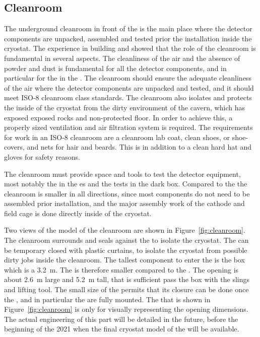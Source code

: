 \subsection{Cleanroom}
The underground cleanroom in front of the  is the main place where the detector components are unpacked, assembled and tested prior the installation inside the cryostat.
The experience in building  and  showed that the role of the cleanroom is fundamental in several aspects.
The cleanliness of the air and the absence of powder and dust is fundamental for all the detector components, and in particular for the  in the .
The cleanroom should ensure the adequate cleanliness of the air where the detector components are unpacked and tested, and it should meet ISO-8 cleanroom class standards.
The cleanroom also isolates and protects the inside of the cryostat from the dirty environment of the cavern, which has exposed exposed rocks and non-protected floor.
In order to achieve this, a properly sized ventilation and air filtration system is required.
The requirements for work in an ISO-8 cleanroom are a cleanroom lab coat, clean shoes, or shoe-covers, and nets for hair and beards.
This is in addition to a clean hard hat and gloves for safety reasons.

The cleanroom must provide space and tools to test the detector equipment, most notably the  in the  \coldbox{}es and the  tests in the dark box.
Compared to the  the cleanroom is smaller in all  directions, since most components do not need to be assembled prior installation, and the major assembly work of the cathode and field cage is done directly inside of the cryostat.

Two views of the \threed model of the cleanroom are shown in Figure~\ref{fig:cleanroom}.
The cleanroom surrounds and seals against the  to isolate the cryostat.
The  can be temporary closed with plastic curtains, to isolate the cryostat from possible dirty jobs inside the cleanroom.
The tallest component to enter the  is the  box which is a 3.2~m.
The  is therefore smaller compared to the .
The opening is about 2.6~m large and 5.2~m tall, that is sufficient pass the  box with the slings and lifting tool.
The small size of the  permits that its closure can be done once the , and in particular the  are fully mounted.
The  that is shown in Figure~\ref{fig:cleanroom} is only for visually representing the opening dimensions.
The actual engineering of this part will be detailed in the future, before the beginning of the 2021 when the final cryostat model of the  will be available.

